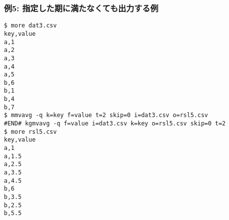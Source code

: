 \subsubsection*{例5: 指定した期に満たなくても出力する例}



\begin{Verbatim}[baselinestretch=0.7,frame=single]
$ more dat3.csv
key,value
a,1
a,2
a,3
a,4
a,5
b,6
b,1
b,4
b,7
$ mmvavg -q k=key f=value t=2 skip=0 i=dat3.csv o=rsl5.csv
#END# kgmvavg -q f=value i=dat3.csv k=key o=rsl5.csv skip=0 t=2
$ more rsl5.csv
key,value
a,1
a,1.5
a,2.5
a,3.5
a,4.5
b,6
b,3.5
b,2.5
b,5.5
\end{Verbatim}
